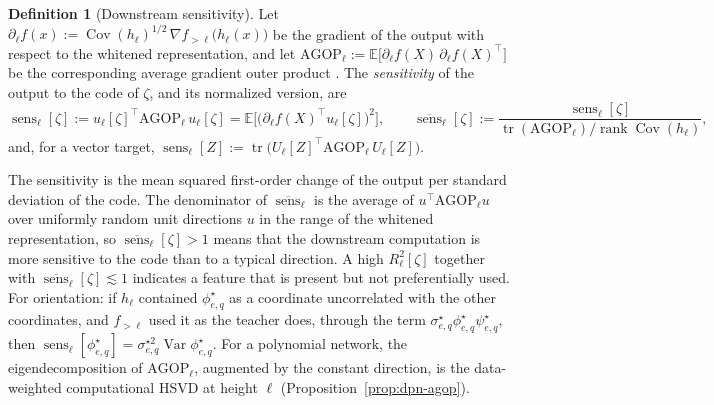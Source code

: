 \documentclass[11pt]{article}
\newcommand{\rank}{\operatorname{rank}}
\newcommand{\E}{\mathbb{E}}
\newcommand{\Cov}{\operatorname{Cov}}
\newcommand{\Var}{\operatorname{Var}}
\theoremstyle{definition}
\newtheorem{definition}[theorem]{Definition}
\numberwithin{equation}{section}
\begin{document}
\begin{definition}[Downstream sensitivity]\label{def:sensitivity}
Let $\partial_\ell f(x):=\Cov(h_\ell)^{1/2}\,\nabla f_{>\ell}\big(h_\ell(x)\big)$ be the gradient of the output with respect to the whitened representation, and let $\mathrm{AGOP}_\ell:=\E\big[\partial_\ell f(X)\,\partial_\ell f(X)^\top\big]$ be the corresponding average gradient outer product \citep[cf.][]{radhakrishnan2024mechanism}. The \emph{sensitivity} of the output to the code of $\zeta$, and its normalized version, are
\[
\operatorname{sens}_\ell[\zeta]:=u_\ell[\zeta]^\top\mathrm{AGOP}_\ell\,u_\ell[\zeta]=\E\Big[\big(\partial_\ell f(X)^\top u_\ell[\zeta]\big)^2\Big],\qquad
\overline{\operatorname{sens}}_\ell[\zeta]:=\frac{\operatorname{sens}_\ell[\zeta]}{\operatorname{tr}(\mathrm{AGOP}_\ell)/\rank\Cov(h_\ell)},
\]
and, for a vector target, $\operatorname{sens}_\ell[Z]:=\operatorname{tr}\big(U_\ell[Z]^\top\mathrm{AGOP}_\ell\,U_\ell[Z]\big)$.
\end{definition}

The sensitivity is the mean squared first-order change of the output per standard deviation of the code. The denominator of $\overline{\operatorname{sens}}_\ell$ is the average of $u^\top\mathrm{AGOP}_\ell u$ over uniformly random unit directions $u$ in the range of the whitened representation, so $\overline{\operatorname{sens}}_\ell[\zeta]>1$ means that the downstream computation is more sensitive to the code than to a typical direction. A high $R^2_\ell[\zeta]$ together with $\overline{\operatorname{sens}}_\ell[\zeta]\lesssim1$ indicates a feature that is present but not preferentially used. For orientation: if $h_\ell$ contained $\phi^\star_{e,q}$ as a coordinate uncorrelated with the other coordinates, and $f_{>\ell}$ used it as the teacher does, through the term $\sigma^\star_{e,q}\phi^\star_{e,q}\psi^\star_{e,q}$, then $\operatorname{sens}_\ell[\phi^\star_{e,q}]=\sigma^{\star2}_{e,q}\Var\phi^\star_{e,q}$. For a polynomial network, the eigendecomposition of $\mathrm{AGOP}_\ell$, augmented by the constant direction, is the data-weighted computational HSVD at height $\ell$ (Proposition~\ref{prop:dpn-agop}).
\end{document}
